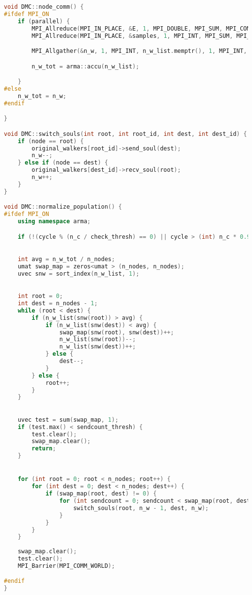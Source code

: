\newpage
\begin{lstlisting}[language=c++, basicstyle=\scriptsize]
void DMC::node_comm() {
#ifdef MPI_ON
    if (parallel) {
        MPI_Allreduce(MPI_IN_PLACE, &E, 1, MPI_DOUBLE, MPI_SUM, MPI_COMM_WORLD);
        MPI_Allreduce(MPI_IN_PLACE, &samples, 1, MPI_INT, MPI_SUM, MPI_COMM_WORLD);

        MPI_Allgather(&n_w, 1, MPI_INT, n_w_list.memptr(), 1, MPI_INT, MPI_COMM_WORLD);

        n_w_tot = arma::accu(n_w_list);

    }
#else
    n_w_tot = n_w;
#endif

}

void DMC::switch_souls(int root, int root_id, int dest, int dest_id) {
    if (node == root) {
        original_walkers[root_id]->send_soul(dest);
        n_w--;
    } else if (node == dest) {
        original_walkers[dest_id]->recv_soul(root);
        n_w++;
    }
}

void DMC::normalize_population() {
#ifdef MPI_ON
    using namespace arma;

    if (!(cycle % (n_c / check_thresh) == 0) || cycle > (int) n_c * 0.9) return;

    
    int avg = n_w_tot / n_nodes;
    umat swap_map = zeros<umat > (n_nodes, n_nodes);
    uvec snw = sort_index(n_w_list, 1);

    
    int root = 0;
    int dest = n_nodes - 1;
    while (root < dest) {
        if (n_w_list(snw(root)) > avg) {
            if (n_w_list(snw(dest)) < avg) {
                swap_map(snw(root), snw(dest))++;
                n_w_list(snw(root))--;
                n_w_list(snw(dest))++;
            } else {
                dest--;
            }
        } else {
            root++;
        }
    }

    
    uvec test = sum(swap_map, 1);
    if (test.max() < sendcount_thresh) {
        test.clear();
        swap_map.clear();
        return;
    }


    for (int root = 0; root < n_nodes; root++) {
        for (int dest = 0; dest < n_nodes; dest++) {
            if (swap_map(root, dest) != 0) {
                for (int sendcount = 0; sendcount < swap_map(root, dest); sendcount++) {
                    switch_souls(root, n_w - 1, dest, n_w);
                }
            }
        }
    }
    
    swap_map.clear();
    test.clear();
    MPI_Barrier(MPI_COMM_WORLD);

#endif
}
\end{lstlisting}

